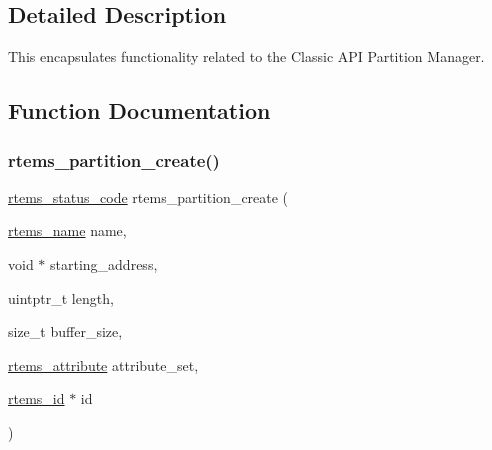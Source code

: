 

\subsection{Detailed Description}
This encapsulates functionality related to the Classic A\+PI Partition Manager. 

\subsection{Function Documentation}
\mbox{\label{group__ClassicPart_gaae1e45358170b1de610acdae7f4a8148}} 
\subsubsection{\texorpdfstring{rtems\_partition\_create()}{rtems\_partition\_create()}}
{\footnotesize\ttfamily \mbox{\hyperlink{group__ClassicStatus_ga545d41846817eaba6143d52ee4d9e9fe}{rtems\+\_\+status\+\_\+code}} rtems\+\_\+partition\+\_\+create (\begin{DoxyParamCaption}\item[{\mbox{\hyperlink{group__ClassicTasks_ga55fb63c49f68c0cbd9bee004da15b1fd}{rtems\+\_\+name}}}]{name,  }\item[{void $\ast$}]{starting\+\_\+address,  }\item[{uintptr\+\_\+t}]{length,  }\item[{size\+\_\+t}]{buffer\+\_\+size,  }\item[{\mbox{\hyperlink{group__ClassicAttributes_gaea40313cf78ed843e09c4315d0a10f79}{rtems\+\_\+attribute}}}]{attribute\+\_\+set,  }\item[{\mbox{\hyperlink{group__ClassicTasks_gab20892b814dced7dd4e5b9bf42becd57}{rtems\+\_\+id}} $\ast$}]{id }\end{DoxyParamCaption})}



